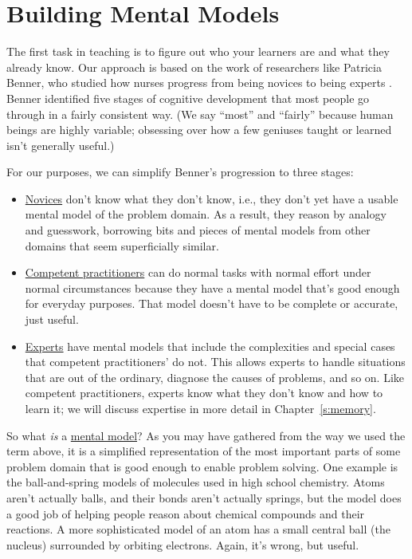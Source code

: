 \chapter{Building Mental Models}\label{s:models}

The first task in teaching is to figure out who your learners are and
what they already know. Our approach is based on the work of researchers
like Patricia Benner, who studied how nurses progress from being novices
to being experts \cite{Benn2000}. Benner identified five stages of
cognitive development that most people go through in a fairly consistent
way. (We say ``most'' and ``fairly'' because human beings are highly
variable; obsessing over how a few geniuses taught or learned isn't
generally useful.)

For our purposes, we can simplify Benner's progression to three stages:

\begin{itemize}
\item
  \protect\hyperlink{g:novice}{Novices}
  don't know what they don't know, i.e., they don't yet have a usable
  mental model of the problem domain. As a result, they reason by
  analogy and guesswork, borrowing bits and pieces of mental models
  from other domains that seem superficially similar.
\item
  \protect\hyperlink{g:competent-practitioner}{Competent practitioners}
  can do normal tasks with normal effort under normal circumstances
  because they have a mental model that's good enough for everyday
  purposes. That model doesn't have to be complete or accurate, just
  useful.
\item
  \protect\hyperlink{g:expert}{Experts}
  have mental models that include the complexities and special cases
  that competent practitioners' do not. This allows experts to handle
  situations that are out of the ordinary, diagnose the causes of
  problems, and so on. Like competent practitioners, experts know what
  they don't know and how to learn it; we will discuss expertise in
  more detail in Chapter~\ref{s:memory}.
\end{itemize}

So what \emph{is} a \protect\hyperlink{g:mental-model}{mental model}? As you may
have gathered from the way we used the term above, it is a simplified
representation of the most important parts of some problem domain that
is good enough to enable problem solving. One example is the
ball-and-spring models of molecules used in high school chemistry. Atoms
aren't actually balls, and their bonds aren't actually springs, but the
model does a good job of helping people reason about chemical compounds
and their reactions. A more sophisticated model of an atom has a small
central ball (the nucleus) surrounded by orbiting electrons. Again, it's
wrong, but useful.

